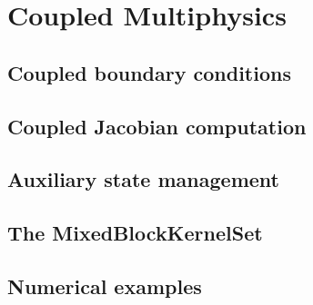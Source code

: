 \chapter{Coupled Multiphysics}
\label{ch:coupled}

\section{Coupled boundary conditions}
\label{sec:coupled:bc}


\section{Coupled Jacobian computation}
\label{sec:coupled:jacobian}


\section{Auxiliary state management}
\label{sec:coupled:auxiliary}


\section{The MixedBlockKernelSet}
\label{sec:coupled:blockkernel}


\section{Numerical examples}
\label{sec:coupled:examples}

